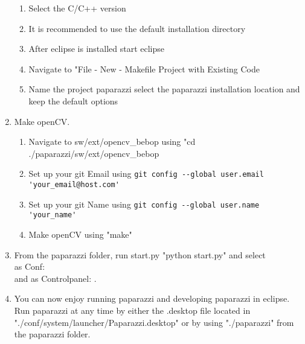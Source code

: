 \documentclass{article}
\begin{document}
\begin{enumerate}
{\begin{enumerate}
\item{Select the C/C++ version}
\item{It is recommended to use the default installation directory}
\item{After eclipse is installed start eclipse}
\item{Navigate to "File - New - Makefile Project with Existing Code}
\item{Name the project paparazzi select the paparazzi installation location and keep the default options}
\end{enumerate}
}
\item{Make openCV.
\begin{enumerate}
\item{Navigate to sw/ext/opencv\_bebop using "cd ./paparazzi/sw/ext/opencv\_bebop}
\item{Set up your git Email using \verb"git config --global user.email 'your_email@host.com'"}
\item{Set up your git Name using \verb"git config --global user.name 'your_name'"}
\item{Make openCV using "make"}
\end{enumerate}
}
\item{From the paparazzi folder, run start.py "python start.py" and select\\
as Conf: \\
and as Controlpanel: . }
\item{You can now enjoy running paparazzi and developing paparazzi in eclipse. Run paparazzi at any time by either the .desktop file located in "./conf/system/launcher/Paparazzi.desktop" or by using "./paparazzi" from the paparazzi folder.}
\end{enumerate}
\end{document}
